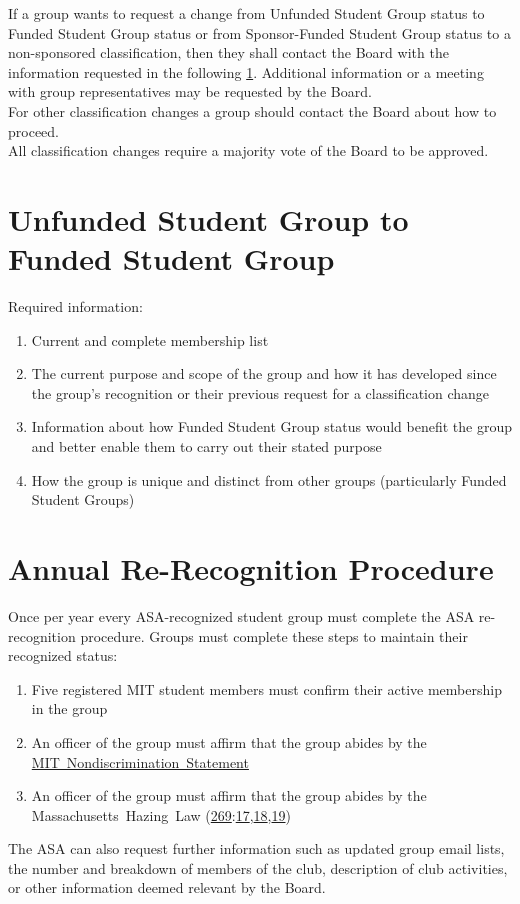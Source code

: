 \documentclass[12pt]{constitution}
\newcommand{\MHL}{%
    Massachusetts~Hazing~Law (\href{https://malegislature.gov/Laws/GeneralLaws/PartIV/TitleI/Chapter269}{269}:\href{https://malegislature.gov/Laws/GeneralLaws/PartIV/TitleI/Chapter269/Section17}{17},\href{https://malegislature.gov/Laws/GeneralLaws/PartIV/TitleI/Chapter269/Section18}{18},\href{https://malegislature.gov/Laws/GeneralLaws/PartIV/TitleI/Chapter269/Section19}{19})\xspace
}
\newcommand{\NDS}{\href{https://handbook.mit.edu/nondiscrimination}{MIT~Nondiscrimination~Statement}\xspace}
\begin{document}
If a group wants to request a change from Unfunded Student Group status to Funded Student Group
    status or from Sponsor-Funded Student Group status to a non-sponsored classification, then they shall
    contact the Board with the information requested in the following \ref{app:B_artVI_sect1}.
Additional information or a meeting with group representatives may be requested by the Board.
\\

For other classification changes a group should contact the Board about how to proceed.
\\

All classification changes require a majority vote of the Board to be approved.


\section{Unfunded Student Group to Funded Student Group}
\label{app:B_artVI_sect1}
Required information:
\begin{enumerate}
    \item Current and complete membership list
    \item The current purpose and scope of the group and how it has developed since the group's
        recognition or their previous request for a classification change
    \item Information about how Funded Student Group status would benefit the group and better
        enable them to carry out their stated purpose
    \item How the group is unique and distinct from other groups (particularly Funded Student Groups)
\end{enumerate}



\section{Annual Re-Recognition Procedure}
Once per year every ASA-recognized student group must complete the ASA re-recognition procedure.
Groups must complete these steps to maintain their recognized status:
\begin{enumerate}
    \item Five registered MIT student members must confirm their active membership in the group
    \item An officer of the group must affirm that the group abides by the \NDS
    \item An officer of the group must affirm that the group abides by the \MHL
\end{enumerate}
The ASA can also request further information such as updated group email lists, the number and
    breakdown of members of the club, description of club activities, or other information
    deemed relevant by the Board.
\\
\end{document}
